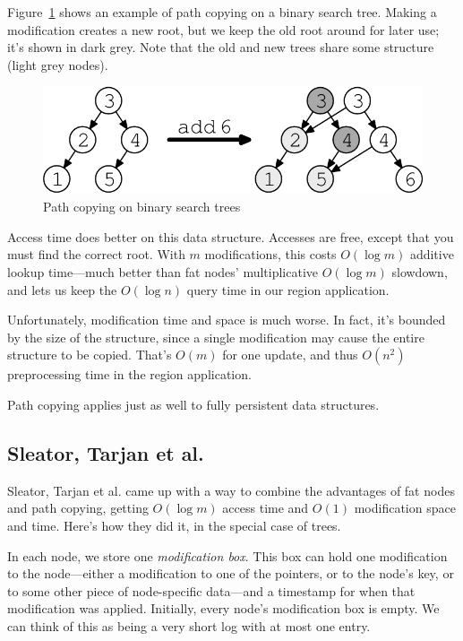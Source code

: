 \documentclass{article}
\begin{document}
Figure~\ref{pathcopy} shows an example of path copying on a binary search
tree. Making a modification creates a new root, but we keep the old root
around for later use; it's shown in dark grey. Note that the old and new
trees share some structure (light grey nodes).

\begin{figure}[ht]
\begin{center}
  \includegraphics{scribe5fig.1.png}
\end{center}
\caption{Path copying on binary search trees}
\label{pathcopy}
\end{figure}

Access time does better on this data structure. Accesses are free, except
that you must find the correct root. With $m$ modifications, this costs
$O(\log m)$ additive lookup time---much better than fat nodes'
multiplicative $O(\log m)$ slowdown, and lets us keep the $O(\log n)$ query
time in our region application.

Unfortunately, modification time and space is much worse. In fact, it's
bounded by the size of the structure, since a single modification may cause
the entire structure to be copied. That's $O(m)$ for one update, and thus
$O(n^2)$ preprocessing time in the region application.

Path copying applies just as well to fully persistent data structures.


\subsection{Sleator, Tarjan et al.}

Sleator, Tarjan et al. came up with a way to combine the advantages of fat
nodes and path copying, getting $O(\log m)$ access time and $O(1)$
modification space and time. Here's how they did it, in the special case of
trees.

In each node, we store one \emph{modification box}. This box can hold one
modification to the node---either a modification to one of the pointers, or
to the node's key, or to some other piece of node-specific data---and a
timestamp for when that modification was applied. Initially, every node's
modification box is empty.
We can think of this as being a very short log with at most one entry.
\end{document}
